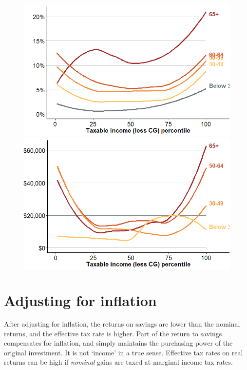 \documentclass{grattan}\usepackage[]{graphicx}\usepackage[]{color}
\begin{document}
\begin{figure}
\includegraphics[width=\columnwidth]{CGT-NG-atlas//CGT-by-age-income-1}
\includegraphics[width=\columnwidth]{CGT-NG-atlas//CGT-by-age-income-weight-CG-1}
\end{figure}

\section{Adjusting for inflation}
After adjusting for inflation, the returns on savings are lower than the nominal returns, and the effective tax rate is higher. Part of the return to savings compensates for inflation, and simply maintains the purchasing power of the original investment. It is not `income' in a true sense.  Effective tax rates on real returns can be high if \emph{nominal} gains are taxed at marginal income tax rates. 
\end{document}
